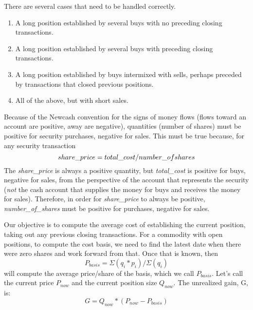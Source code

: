 \documentclass{report}
\begin{document}
There are several cases that need to be handled correctly.
\begin{enumerate}
\item A long position established by several buys with no preceding closing transactions.
\item A long position established by several buys with preceding closing transactions.
\item A long position established by buys intermixed with sells, perhaps preceded by transactions that closed previous positions.
\item All of the above, but with short sales.
\end{enumerate}
Because of the Newcash convention for the signs of money flows (flows toward an account are positive, away are negative), quantities (number of shares) must be positive for security purchases, negative for sales.
This must be true because, for any security transaction
\[share\_price = total\_cost / number\_of\-shares\]
The \emph{share\_price} is always a positive quantity, but \emph{total\_cost} is positive for buys, negative for sales, from the perspective of the account that represents the security (\emph{not} the cash account that supplies the money for buys and receives the money for sales). Therefore, in order for \emph{share\_price} to always be positive, \emph{number\_of\_shares} must be positive for purchases, negative for sales.

Our objective is to compute the average cost of establishing the current position, taking out any previous closing transactions.
For a commodity with open positions, to compute the cost basis, we need to find the latest date when there were zero shares and work forward from that.
Once that is known, then 
\[P_{basis}=\Sigma(q_i*p_i)/\Sigma(q_i)\]
will compute the average price/share of the basis, which we call $P_{basis}$. Let's call the current price $P_{now}$ and the current position size $Q_{now}$.  The unrealized gain, G, is:
\[G = Q_{now} * (P_{now}-P_{basis})\]
\end{document}
